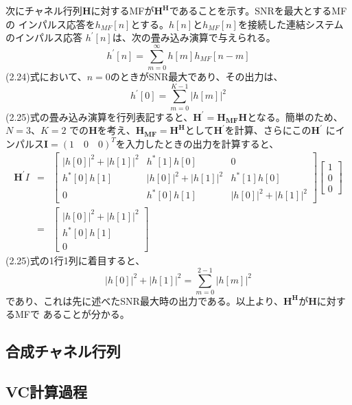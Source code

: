 次にチャネル行列$\bm{H}$に対するMFが$\bm{H^H}$であることを示す。SNRを最大とするMFの
インパルス応答を$h_{MF}[n]$とする。$h[n]$と$h_{MF}[n]$を接続した連結システムのインパルス応答
$h^{\prime}[n]$は、次の畳み込み演算で与えられる。
\begin{equation}
    h^{\prime}[n] = \sum_{m=0}^{\infty} h[m]h_{MF}[n-m]
\end{equation}
(2.24)式において、$n=0$のときがSNR最大であり、その出力は、
\begin{equation}
    h^{\prime}[0] = \sum_{m=0}^{K-1} |h[m]|^2
\end{equation}
(2.25)式の畳み込み演算を行列表記すると、$\bm{H^{\prime}}=\bm{H_{MF}H}$となる。簡単のため、$N=3$、$K=2$
での$\bm{H}$を考え、$\bm{H_{MF}=\bm{H^H}}$として$\bm{H^{\prime}}$を計算、さらにこの$\bm{H^{\prime}}$
にインパルス$\bm{I}=(1 \quad 0 \quad 0)^T$を入力したときの出力を計算すると、
\begin{eqnarray}
    \bm{H^{\prime}}I &=& \left[
        \begin{array}{ccc}
            |h[0]|^2+|h[1]|^2 & h^*[1]h[0] & 0 \\
            h^*[0]h[1] & |h[0]|^2+|h[1]|^2 & h^*[1]h[0] \\
            0 & h^*[0]h[1] & |h[0]|^2+|h[1]|^2
        \end{array}
    \right]
    \left[
        \begin{array}{c}
            1 \\
            0 \\
            0
        \end{array} 
    \right] \nonumber \\
    &=& \left[
        \begin{array}{c}
            |h[0]|^2+|h[1]|^2 \\
            h^*[0]h[1] \\
            0
        \end{array}
    \right]
\end{eqnarray}
(2.25)式の1行1列に着目すると、
\begin{equation}
    |h[0]|^2+|h[1]|^2 = \sum_{m=0}^{2-1} |h[m]|^2 \nonumber
\end{equation}
であり、これは先に述べたSNR最大時の出力である。以上より、$\bm{H^H}$が$\bm{H}$に対するMFで
あることが分かる。

\subsection{合成チャネル行列}
\subsection{VC計算過程}

